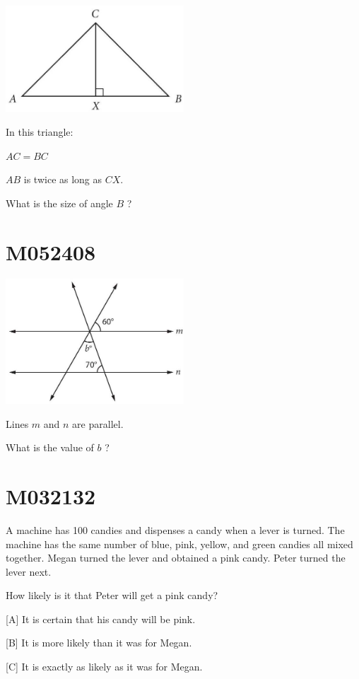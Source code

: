 \documentclass[12pt]{article}
\begin{document}
\includegraphics[max width=0.5\textwidth]{2024_02_20_828ebc9d68bcc1fbb223g-69}


In this triangle:

$A C=B C$

$A B$ is twice as long as $C X$.

What is the size of angle $B$ ?

\newpage
\section*{M052408}


\includegraphics[max width=0.5\textwidth]{2024_02_20_828ebc9d68bcc1fbb223g-70}


Lines $m$ and $n$ are parallel.

What is the value of $b$ ?

\newpage
\section*{M032132}

A machine has 100 candies and dispenses a candy when a lever is turned. The machine has the same number of blue, pink, yellow, and green candies all mixed together. Megan turned the lever and obtained a pink candy. Peter turned the lever next.

How likely is it that Peter will get a pink candy?

[A] It is certain that his candy will be pink.

[B] It is more likely than it was for Megan.

[C] It is exactly as likely as it was for Megan.
\end{document}
